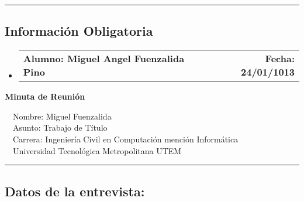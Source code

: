 \documentclass[10pt,letterpaper]{article}
\makeatletter
\newcommand{\headerrow}[2]
{\begin{tabular*}{\linewidth}{l@{\extracolsep{\fill}}r}
	#1 &
	#2 \\
\end{tabular*}}
\makeatother
\begin{document}
\hrule
\vspace{-0.4em}
\subsection*{Información Obligatoria}

\begin{itemize}
	\parskip=0.1em

	\item 
	\headerrow
		{\textbf{Alumno: Miguel Angel Fuenzalida Pino}}
		{\textbf{Fecha: 24/01/1013}}

\end{itemize}
\newpage
\begin{center}
{\LARGE \textbf{Minuta de Reunión}}

\ \ \textbullet Nombre: Miguel Fuenzalida
\\
\ \ \textbullet Asunto: Trabajo de Título
\\
\ \ \textbullet Carrera: Ingeniería Civil en Computación mención Informática
\\
\ \ \textbullet Universidad Tecnológica Metropolitana UTEM
\end{center}

\hrule
\vspace{-0.4em}
\subsection*{Datos de la entrevista:}
\end{document}
